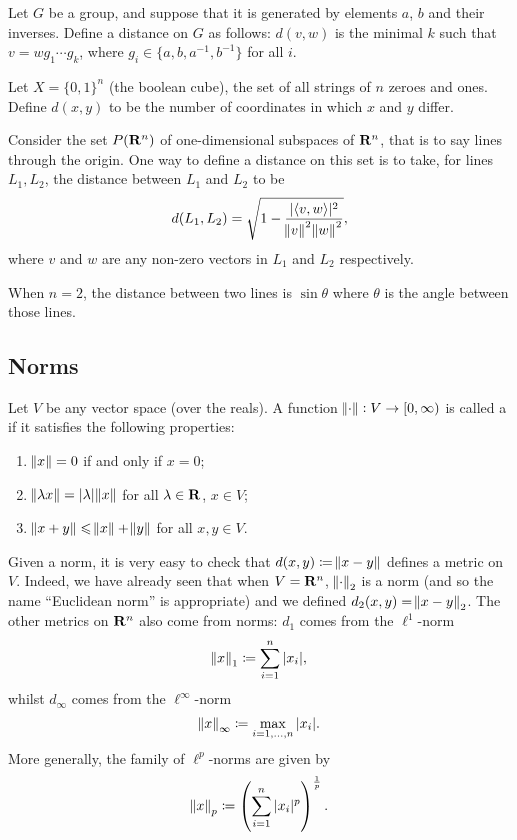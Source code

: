 \begin{example}
Let $G$ be a group, and suppose that it is generated by elements $a$, $b$ and their inverses. Define a distance on $G$ as follows: $d(v,w)$ is the minimal $k$ such that $v=wg_1\cdots g_k$, where $g_i\in\{a,b,a^{-1},b^{-1}\}$ for all $i$.
\end{example}

\begin{example}
Let $X=\{0,1\}^n$ (the boolean cube), the set of all strings of $n$ zeroes and ones. Define $d(x,y)$ to be the number of coordinates
in which $x$ and $y$ differ.
\end{example}

\begin{example}
Consider the set $P(\mathbf R^n)$ of one-dimensional subspaces of $\mathbf R^n$, that is to say lines through the origin. One way to define a distance on this set is to take, for lines $L_1,L_2$, the distance between $L_1$ and $L_2$ to be
\[d(L_1,L_2)=\sqrt{1-\frac{|\langle v,w\rangle|^2}{\norm{v}^2\norm{w}^2}},\]
where $v$ and $w$ are any non-zero vectors in $L_1$ and $L_2$ respectively.

When $n=2$, the distance between two lines is $\sin\theta$ where $\theta$ is the angle between those lines.
\end{example}

\subsection{Norms}
\begin{definition}[Norms]
Let $V$ be any vector space (over the reals). A function $\norm{\cdot}:V\to[0,\infty)$ is called a  if it satisfies the following properties:
\begin{enumerate}[label=(\roman*)]
\item $\norm{x}=0$ if and only if $x=0$;
\item $\norm{\lambda x}=|\lambda|\norm{x}$ for all $\lambda\in\mathbf R$, $x\in V$;
\item $\norm{x+y}\leqslant\norm{x}+\norm{y}$ for all $x,y\in V$.
\end{enumerate}
\end{definition}

Given a norm, it is very easy to check that $d(x,y)\coloneqq\norm{x-y}$ defines a metric on $V$. Indeed, we have already seen that when $V=\mathbf R^n$, $\norm{\cdot}_2$ is a norm (and so the name ``Euclidean norm'' is appropriate) and we defined $d_2(x,y)=\norm{x-y}_2$. The other metrics on $\mathbf R^n$ also come from norms: $d_1$ comes from the $\ell^1$-norm
\[\norm{x}_1\coloneqq\sum_{i=1}^n|x_i|,\]
whilst $d_\infty$ comes from the $\ell^\infty$-norm
\[\norm{x}_\infty\coloneqq\max_{i=1,\dots,n}|x_i|.\]
More generally, the family of $\ell^p$-norms are given by
\[\norm{x}_p\coloneqq\left(\sum_{i=1}^n|x_i|^p\right)^\frac{1}{p}.\]

